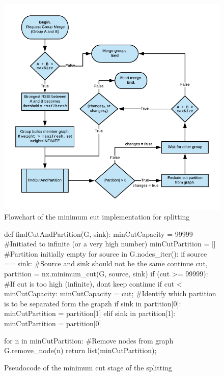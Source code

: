 \begin{figure}
	\includegraphics[width=\textwidth]{Images/mincutflow2.png}
		\caption{Flowchart of the minimum cut implementation for splitting}%
		\label{fig:mincutflow}%
\end{figure}


	\begin{figure}
		\tiny
		\begin{python}
			def findCutAndPartition(G, sink):
				minCutCapacity = 99999 #Initiated to infinite (or a very high number)
				minCutPartition = [] #Partition initially empty
				for source in G.nodes_iter():
					if source == sink: #Source and sink should not be the same
							continue
					cut, partition = nx.minimum_cut(G, source, sink)
					if (cut >= 99999): #If cut is too high (infinite), dont keep
							continue
					if cut < minCutCapacity:
							minCutCapacity = cut;
							#Identify which partition is to be separated form the grapzh
							if sink in partition[0]:
									minCutPartition = partition[1]
							elif sink in partition[1]:
									minCutPartition = partition[0]

				for n in minCutPartition: #Remove nodes from graph
							G.remove_node(n)
				return list(minCutPartition);
		\end{python}
		\caption{Pseudocode of the minimum cut stage of the splitting}
		\label{fig:pseudocut}
	\end{figure}


